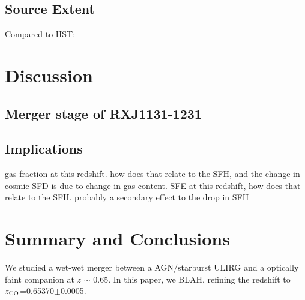 \documentclass[]{emulateapj}
\begin{document}
\subsection{Source Extent}
Compared to HST:

\section{Discussion}
\subsection{Merger stage of RXJ1131-1231}



\subsection{Implications}
gas fraction at this redshift. how does that relate to
the SFH, and the change in cosmic SFD is due to change in gas content.
SFE at this redshift, how does that relate to the SFH. probably a secondary effect to the drop in SFH


\section{Summary and Conclusions}
We studied a wet-wet merger between a AGN/starburst ULIRG and a optically faint companion at $z$ $\sim$ 0.65.
In this paper, we BLAH, refining the redshift to $z_{\rm CO}$=0.65370$\pm$0.0005.






\acknowledgments




\end{document}
